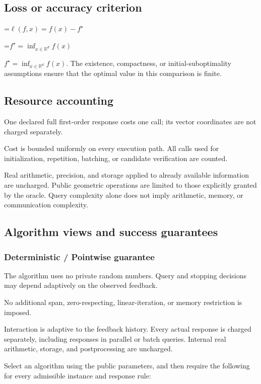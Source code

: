 \documentclass[10pt,a4paper]{article}
\newcommand{\AtlasMath}[1]{\par\begingroup\centering\setbox0=\hbox{$\displaystyle #1$}\ifdim\wd0>1.4\linewidth\typeout{ATLAS WIDE FORMULA: \the\wd0}\fi\ifdim\wd0>\linewidth\resizebox{\linewidth}{!}{\box0}\else\box0\fi\par\endgroup}
\newcommand{\AtlasInlineMath}[1]{\begingroup\setbox0=\hbox{$#1$}\ifdim\wd0>.4\linewidth\endgroup\AtlasMath{#1}\else\endgroup$#1$\fi}
\begin{document}
\subsection{Loss or accuracy criterion}

\AtlasMath{\ell(f,x)=f(x)-f^\star}


\AtlasInlineMath{f^\star=\inf_{x\in \mathbb{R}^d}f(x)}. The existence, compactness, or initial-suboptimality assumptions ensure that the optimal value in this comparison is finite.

\subsection{Resource accounting}
One declared full first-order response costs one call; its vector coordinates are not charged separately.

Cost is bounded uniformly on every execution path. All calls used for initialization, repetition, batching, or candidate verification are counted.

Real arithmetic, precision, and storage applied to already available information are uncharged. Public geometric operations are limited to those explicitly granted by the oracle. Query complexity alone does not imply arithmetic, memory, or communication complexity.

\subsection{Algorithm views and success guarantees}
\subsubsection{Deterministic / Pointwise guarantee}
The algorithm uses no private random numbers. Query and stopping decisions may depend adaptively on the observed feedback.

No additional span, zero-respecting, linear-iteration, or memory restriction is imposed.

Interaction is adaptive to the feedback history. Every actual response is charged separately, including responses in parallel or batch queries. Internal real arithmetic, storage, and postprocessing are uncharged.

Select an algorithm using the public parameters, and then require the following for every admissible instance and response rule:
\end{document}
